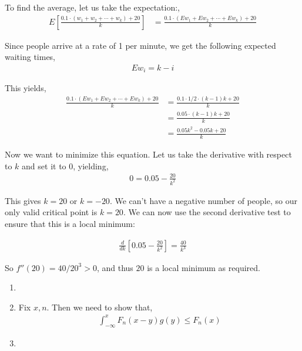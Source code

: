 \documentclass[12pt]{article}
\newenvironment{problem}[2][Problem]{\begin{trivlist}
\item[\hskip \labelsep {\bfseries #1}\hskip \labelsep {\bfseries #2.}]}{\end{trivlist}}
\begin{document}
To find the average, let us take the expectation:,
\begin{align*}
E \left[\frac{0.1 \cdot (w_1 + w_2 + \cdots + w_k) + 20}{k}\right] &= \frac{0.1 \cdot (Ew_1 + Ew_2 + \cdots + Ew_k) + 20}{k}
\end{align*}

Since people arrive at a rate of 1 per minute, we get the following expected waiting times,
\begin{align*}
Ew_i = k - i
\end{align*}

This yields,
\begin{align*}
\frac{0.1 \cdot (Ew_1 + Ew_2 + \cdots + Ew_k) + 20}{k} &= \frac{0.1 \cdot 1/2 \cdot (k-1)k + 20}{k}\\
&= \frac{0.05 \cdot (k-1)k + 20}{k}\\
&= \frac{0.05k^2 - 0.05k + 20}{k}
\end{align*}

Now we want to minimize this equation. Let us take the derivative with respect to $k$ and set it to $0$, yielding,
\begin{align*}
0 = 0.05 - \frac{20}{k^2}
\end{align*}

This gives $k = 20$ or $k = -20$. We can't have a negative number of people, so our only valid critical point is $k = 20$. We can now use the second derivative test to ensure that this is a local minimum:

\begin{align*}
\frac{d}{dk} \left[0.05 - \frac{20}{k^2}\right] = \frac{40}{k^3}
\end{align*} 

So $f''(20) = 40/20^3 > 0$, and thus $20$ is a local minimum as required.

\begin{problem}{4}
\end{problem}

\begin{enumerate}[label=\Alph*)]

\item

\item Fix $x, n$. Then we need to show that,
\begin{align*}
\int_{-\infty}^x F_n(x - y)g(y) \leq F_n(x)
\end{align*}

\item

\end{enumerate}
\end{document}
